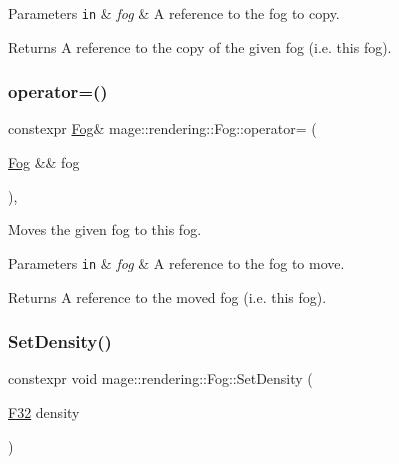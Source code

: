 \begin{DoxyParams}[1]{Parameters}
\mbox{\tt in}  & {\em fog} & A reference to the fog to copy. \\
\hline
\end{DoxyParams}
\begin{DoxyReturn}{Returns}
A reference to the copy of the given fog (i.\+e. this fog). 
\end{DoxyReturn}
\mbox{\label{classmage_1_1rendering_1_1_fog_ae0b197b983b73f78782fecfc491ddd1c}} 
\subsubsection{\texorpdfstring{operator=()}{operator=()}\hspace{0.1cm}{\footnotesize\ttfamily [2/2]}}
{\footnotesize\ttfamily constexpr \mbox{\hyperlink{classmage_1_1rendering_1_1_fog}{Fog}}\& mage\+::rendering\+::\+Fog\+::operator= (\begin{DoxyParamCaption}\item[{\mbox{\hyperlink{classmage_1_1rendering_1_1_fog}{Fog}} \&\&}]{fog }\end{DoxyParamCaption})\hspace{0.3cm}{\ttfamily [default]}, {\ttfamily [noexcept]}}

Moves the given fog to this fog.


\begin{DoxyParams}[1]{Parameters}
\mbox{\tt in}  & {\em fog} & A reference to the fog to move. \\
\hline
\end{DoxyParams}
\begin{DoxyReturn}{Returns}
A reference to the moved fog (i.\+e. this fog). 
\end{DoxyReturn}
\mbox{\label{classmage_1_1rendering_1_1_fog_a9b498c71c58e28bd58b09e4385338a13}} 
\subsubsection{\texorpdfstring{Set\+Density()}{SetDensity()}}
{\footnotesize\ttfamily constexpr void mage\+::rendering\+::\+Fog\+::\+Set\+Density (\begin{DoxyParamCaption}\item[{\mbox{\hyperlink{namespacemage_aa97e833b45f06d60a0a9c4fc22ae02c0}{F32}}}]{density }\end{DoxyParamCaption})\hspace{0.3cm}{\ttfamily [noexcept]}}

